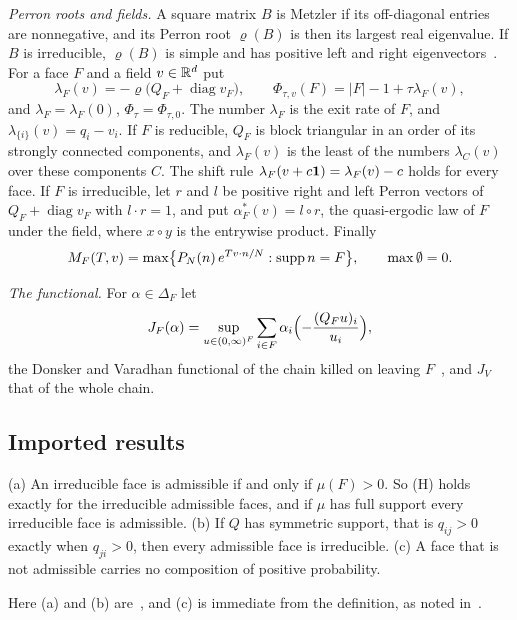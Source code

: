 \emph{Perron roots and fields.} A square matrix $B$ is Metzler if its off-diagonal
entries are nonnegative, and its Perron root $\varrho(B)$ is then its largest real
eigenvalue. If $B$ is irreducible, $\varrho(B)$ is simple and has positive left and
right eigenvectors~\cite{bermanplemmons1994}. For a face $F$ and a field
$v\in\mathbb{R}^d$ put
\[
 \lambda_F(v)=-\varrho\bigl(Q_F+\operatorname{diag}v_F\bigr),\qquad
 \Phi_{\tau,v}(F)=|F|-1+\tau\lambda_F(v),
\]
and $\lambda_F=\lambda_F(0)$, $\Phi_\tau=\Phi_{\tau,0}$. The number $\lambda_F$ is the
exit rate of $F$, and $\lambda_{\{i\}}(v)=q_i-v_i$. If $F$ is reducible, $Q_F$ is block
triangular in an order of its strongly connected components, and $\lambda_F(v)$ is the
least of the numbers $\lambda_C(v)$ over these components $C$. The shift rule
$\lambda_F(v+c\mathbf{1})=\lambda_F(v)-c$ holds for every face. If $F$ is irreducible, let
$r$ and $l$ be positive right and left Perron vectors of $Q_F+\operatorname{diag}v_F$
with $l\cdot r=1$, and put $\alpha^*_F(v)=l\circ r$, the quasi-ergodic law of $F$ under
the field, where $x\circ y$ is the entrywise product. Finally
\[
 M_F(T,v)=\max\bigl\{P_N(n)\,e^{Tv\cdot n/N}:\operatorname{supp} n=F\bigr\},\qquad\max\emptyset=0 .
\]

\emph{The functional.} For $\alpha\in\Delta_F$ let
\[
 J_F(\alpha)=\sup_{u\in(0,\infty)^F}\sum_{i\in F}\alpha_i\Bigl(-\frac{(Q_Fu)_i}{u_i}\Bigr),
\]
the Donsker and Varadhan functional of the chain killed on leaving $F$~\cite{dv1975},
and $J_V$ that of the whole chain.

\subsection{Imported results}\label{sec:imported}

\begin{lemma}\label{lem:admissible}
\textup{(a)} An irreducible face is admissible if and only if $\mu(F)>0$. So
\textup{(H)} holds exactly for the irreducible admissible faces, and if $\mu$ has full
support every irreducible face is admissible. \textup{(b)} If $Q$ has symmetric
support, that is $q_{ij}>0$ exactly when $q_{ji}>0$, then every admissible face is
irreducible. \textup{(c)} A face that is not admissible carries no composition of
positive probability.
\end{lemma}

Here (a) and (b) are~\cite[Lemma~2.2(b) and~(c)]{paperC1}, and (c) is immediate from the
definition, as noted in~\cite[Theorem~4.2(ii)]{paperC1}.


